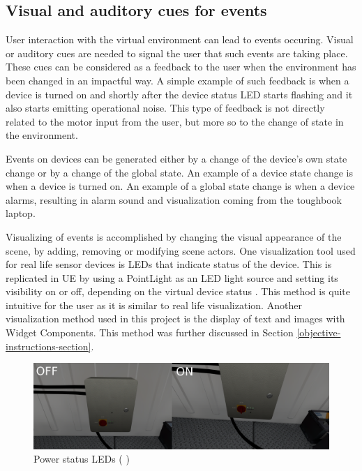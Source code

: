 \documentclass[12pt, a4paper,oneside, nocenter]{thesis}
\renewcommand{\citeyearpar}[1]{(\citeauthor{#1} \citeyear{#1})}
\begin{document}
\subsection{Visual and auditory cues for events}
User interaction with the virtual environment can lead to events occuring. Visual or auditory cues are needed to signal the user that such events are taking place. These cues can be considered as a feedback to the user when the environment has been changed in an impactful way. A simple example of such feedback is when a device is turned on and shortly after the device status LED starts flashing and it also starts emitting operational noise. This type of feedback is not directly related to the motor input from the user, but more so to the change of state in the environment.
\par
Events on devices can be generated either by a change of the device's own state change or by a change of the global state. An example of a device state change is when a device is turned on. An example of a global state change is when a device alarms, resulting in alarm sound and visualization coming from the toughbook laptop.
\par
Visualizing of events is accomplished by changing the visual appearance of the scene, by adding, removing or modifying scene actors. One visualization tool used for real life sensor devices is LEDs that indicate status of the device. This is replicated in UE by using a PointLight as an LED light source and setting its visibility on or off, depending on the virtual device status . This method is quite intuitive for the user as it is similar to real life visualization. Another visualization method used in this project is the display of text and images with Widget Components. This method was further discussed in Section \ref{objective-instructions-section}.
\begin{figure}[H]
	\includegraphics[width=\textwidth]{visualizing-status}
	\caption{Power status LEDs \citeyearpar{obsas-assets}}
	\label{fig:visualizing-status}
\end{figure}
\par
\end{document}
